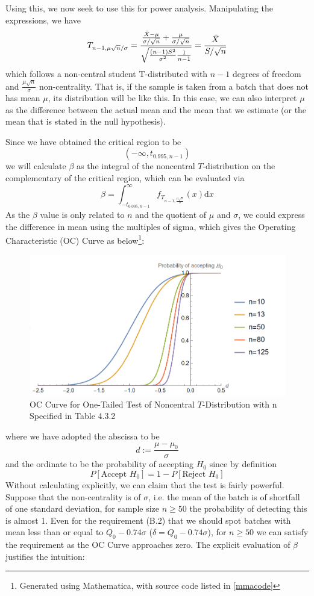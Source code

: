 \documentclass[12pt]{article}
\def\d{\mathrm{d}}
\begin{document}
Using this, we now seek to use this for power analysis. Manipulating the expressions, we have
\begin{equation}\label{noncentralt}
    T_{n-1,\mu\sqrt{n}/\sigma}=\frac{\frac{\Bar{X}-\mu}{\sigma/\sqrt{n}}+\frac{\mu}{\sigma/\sqrt{n}}}{\sqrt{\frac{(n-1)S^2}{\sigma^2}\frac{1}{n-1}}}=\frac{\Bar{X}}{S/\sqrt{n}}
\end{equation}
which follows a non-central student T-distributed with $n-1$ degrees of freedom and $\frac{\mu\sqrt{n}}{\sigma}$ non-centrality. That is, if the sample is taken from a batch that does not has mean $\mu$, its distribution will be like this. In this case, we can also interpret $\mu$ as the difference between the actual mean and the mean that we estimate (or the mean that is stated in the null hypothesis).

Since we have obtained the critical region to be
$$
(-\infty, t_{0.995,n-1})
$$
we will calculate $\beta$ as the integral of the noncentral $T$-distribution on the complementary of the critical region, which can be evaluated via
$$
\beta = \int_{-t_{0.005, n-1}}^{\infty} f_{T_{n-1, \frac{\mu\sqrt{n}}{\sigma}}}(x) \d x
$$
As the $\beta$ value is only related to $n$ and the quotient of $\mu$ and $\sigma$, we could express the difference in mean using the multiples of sigma, which gives the Operating Characteristic (OC) Curve as below\footnote{Generated using Mathematica, with source code listed in \ref{mmacode}}:

\begin{figure}[htbp]
    \centering
    \includegraphics[scale=0.6]{img/oc_noncentral_t.png}
    \caption{OC Curve for One-Tailed Test of Noncentral $T$-Distribution with n Specified in Table 4.3.2}
\end{figure}

\noindent where we have adopted the abscissa to be
$$
d := \dfrac{\mu - \mu_0}{\sigma}
$$
and the ordinate to be the probability of accepting $H_0$ since by definition
$$
P[\text{Accept } H_0] = 1 - P[\text{Reject }H_0]
$$
Without calculating explicitly, we can claim that the test is fairly powerful. Suppose that the non-centrality is of $\sigma$, i.e. the mean of the batch is of shortfall of one standard deviation, for sample size $n\geq 50$ the probability of detecting this is almost 1. Even for the requirement (B.2) that we should spot batches with mean less than or equal to $Q_0 - 0.74\sigma$ ($\delta = Q_0 - 0.74\sigma$), for $n\geq 50$ we can satisfy the requirement as the OC Curve approaches zero. The explicit evaluation of $\beta$ justifies the intuition:
\end{document}
